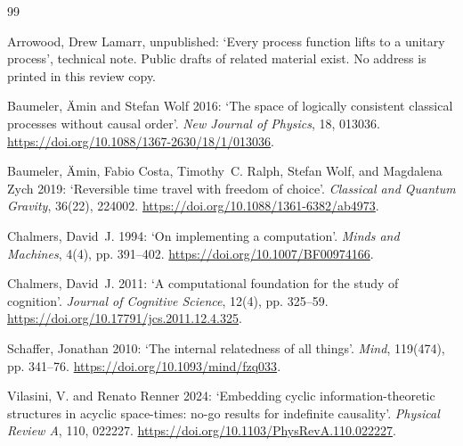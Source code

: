 \documentclass[12pt]{article}
\begin{document}
\begin{thebibliography}{99}

Arrowood, Drew Lamarr, unpublished: `Every process function lifts to a unitary process', technical note. Public drafts of related material exist. No address is printed in this review copy.

Baumeler, \"Amin and Stefan Wolf 2016: `The space of logically consistent classical processes without causal order'. \emph{New Journal of Physics}, 18, 013036. \url{https://doi.org/10.1088/1367-2630/18/1/013036}.

Baumeler, \"Amin, Fabio Costa, Timothy~C. Ralph, Stefan Wolf, and Magdalena Zych 2019: `Reversible time travel with freedom of choice'. \emph{Classical and Quantum Gravity}, 36(22), 224002. \url{https://doi.org/10.1088/1361-6382/ab4973}.

Chalmers, David~J. 1994: `On implementing a computation'. \emph{Minds and Machines}, 4(4), pp. 391--402. \url{https://doi.org/10.1007/BF00974166}.

Chalmers, David~J. 2011: `A computational foundation for the study of cognition'. \emph{Journal of Cognitive Science}, 12(4), pp. 325--59. \url{https://doi.org/10.17791/jcs.2011.12.4.325}.

Schaffer, Jonathan 2010: `The internal relatedness of all things'. \emph{Mind}, 119(474), pp. 341--76. \url{https://doi.org/10.1093/mind/fzq033}.

Vilasini, V. and Renato Renner 2024: `Embedding cyclic information-theoretic structures in acyclic space-times: no-go results for indefinite causality'. \emph{Physical Review A}, 110, 022227. \url{https://doi.org/10.1103/PhysRevA.110.022227}.

\end{thebibliography}
\end{document}
